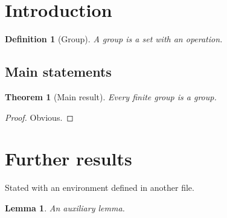 \documentclass{article}
\newtheorem{theorem}{Theorem}
\newtheorem{lemma}{Lemma}
\newtheorem{definition}{Definition}
\begin{document}
\section{Introduction}\label{sec:intro}
\begin{definition}[Group]\label{def:group}
A group is a set with an operation.
\end{definition}

\subsection{Main statements}
\begin{theorem}[Main result]\label{thm:main}
Every finite group is a group.
\end{theorem}
\begin{proof}
Obvious.
\end{proof}

\section{Further results}
\begin{mytheorem}
Stated with an environment defined in another file.
\end{mytheorem}
\begin{lemma}
An auxiliary lemma.
\end{lemma}
\end{document}
